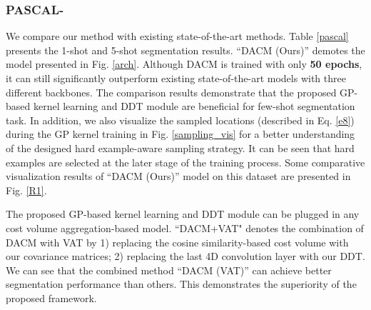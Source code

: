 \documentclass[runningheads]{llncs}
\begin{document}
\subsubsection{PASCAL-}
We compare our method with existing state-of-the-art methods. Table \ref{pascal} presents the 1-shot and 5-shot segmentation results. ``DACM (Ours)'' demotes the model presented in Fig. \ref{arch}. Although DACM is trained with only \textbf{50 epochs}, it can still significantly outperform existing state-of-the-art models \cite{min2021hypercorrelation,hong2021cost} with three different backbones. The comparison results demonstrate that the proposed GP-based kernel learning and DDT module are beneficial for few-shot segmentation task. In addition, we also visualize the sampled locations (described in Eq. \ref{e8}) during the GP kernel training in Fig. \ref{sampling_vis} for a better understanding of the designed hard example-aware sampling strategy. It can be seen that hard examples are selected at the later stage of the training process. Some comparative visualization results of ``DACM (Ours)'' model on this dataset are presented in Fig. \ref{R1}.

The proposed GP-based kernel learning and DDT module can be plugged in any cost volume aggregation-based model. ``DACM+VAT" denotes the combination of DACM with VAT by 1) replacing the cosine similarity-based cost volume with our covariance matrices; 2) replacing the last 4D convolution layer with our DDT.  We can see that the combined method ``DACM (VAT)'' can achieve better segmentation performance than others. This demonstrates the superiority of the proposed framework. 
\end{document}
